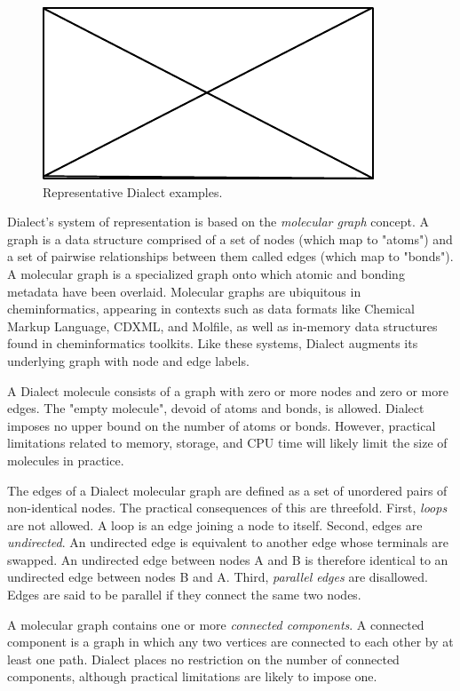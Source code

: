 \documentclass{article}
\begin{document}
\begin{figure}
\centering
\includegraphics{filler}
\caption{Representative Dialect examples.}
\label{fig:myfig}
\end{figure}

Dialect's system of representation is based on the \textit{molecular graph} concept.\cite{balaban1985} A graph is a data structure comprised of a set of nodes (which map to "atoms") and a set of pairwise relationships between them called edges (which map to "bonds"). A molecular graph is a specialized graph onto which atomic and bonding metadata have been overlaid. Molecular graphs are ubiquitous in cheminformatics, appearing in contexts such as data formats like Chemical Markup Language\cite{murrayrust2011}, CDXML\cite{cdxml}, and Molfile\cite{ctfileFormats}, as well as in-memory data structures found in cheminformatics toolkits. Like these systems, Dialect augments its underlying graph with node and edge labels.

A Dialect molecule consists of a graph with zero or more nodes and zero or more edges. The "empty molecule", devoid of atoms and bonds, is allowed. Dialect imposes no upper bound on the number of atoms or bonds. However, practical limitations related to memory, storage, and CPU time will likely limit the size of molecules in practice.

The edges of a Dialect molecular graph are defined as a set of unordered pairs of non-identical nodes. The practical consequences of this are threefold. First, \textit{loops} are not allowed. A loop is an edge joining a node to itself. Second, edges are \textit{undirected}. An undirected edge is equivalent to another edge whose terminals are swapped. An undirected edge between nodes A and B is therefore identical to an undirected edge between nodes B and A. Third, \textit{parallel edges} are disallowed. Edges are said to be parallel if they connect the same two nodes.

A molecular graph contains one or more \textit{connected components}. A connected component is a graph in which any two vertices are connected to each other by at least one path. Dialect places no restriction on the number of connected components, although practical limitations are likely to impose one.
\end{document}
